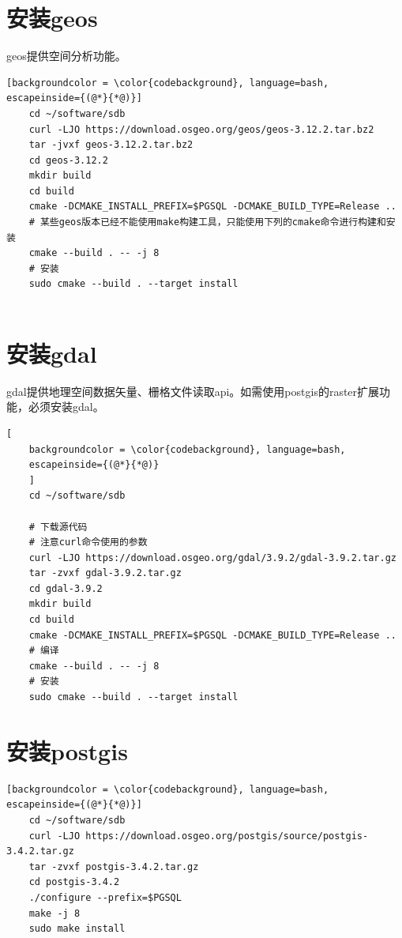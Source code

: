 \section{安装geos}
geos提供空间分析功能。
\begin{lstlisting}[backgroundcolor = \color{codebackground}, language=bash, escapeinside={(@*}{*@)}]
	cd ~/software/sdb
	curl -LJO https://download.osgeo.org/geos/geos-3.12.2.tar.bz2
	tar -jvxf geos-3.12.2.tar.bz2
	cd geos-3.12.2
	mkdir build
	cd build
	cmake -DCMAKE_INSTALL_PREFIX=$PGSQL -DCMAKE_BUILD_TYPE=Release ..
	# 某些geos版本已经不能使用make构建工具，只能使用下列的cmake命令进行构建和安装
	cmake --build . -- -j 8
	# 安装
	sudo cmake --build . --target install 
	
\end{lstlisting}


\section{安装gdal}
gdal提供地理空间数据矢量、栅格文件读取api。如需使用postgis的raster扩展功能，必须安装gdal。
\begin{lstlisting}[
	backgroundcolor = \color{codebackground}, language=bash, 
	escapeinside={(@*}{*@)}
	]
	cd ~/software/sdb
	
	# 下载源代码
	# 注意curl命令使用的参数
	curl -LJO https://download.osgeo.org/gdal/3.9.2/gdal-3.9.2.tar.gz
	tar -zvxf gdal-3.9.2.tar.gz
	cd gdal-3.9.2
	mkdir build
	cd build
	cmake -DCMAKE_INSTALL_PREFIX=$PGSQL -DCMAKE_BUILD_TYPE=Release ..
	# 编译
	cmake --build . -- -j 8
	# 安装
	sudo cmake --build . --target install 
\end{lstlisting}


\section{安装postgis}
\begin{lstlisting}[backgroundcolor = \color{codebackground}, language=bash, escapeinside={(@*}{*@)}]
	cd ~/software/sdb
	curl -LJO https://download.osgeo.org/postgis/source/postgis-3.4.2.tar.gz
	tar -zvxf postgis-3.4.2.tar.gz
	cd postgis-3.4.2
	./configure --prefix=$PGSQL 
	make -j 8
	sudo make install
\end{lstlisting}



